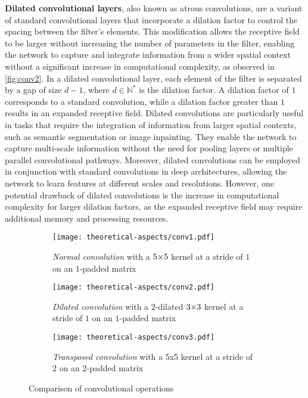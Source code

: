 \textbf{Dilated convolutional layers}, also known as atrous convolutions, are a variant of standard convolutional layers that incorporate a dilation factor to control the spacing between the filter's elements. This modification allows the receptive field to be larger without increasing the number of parameters in the filter, enabling the network to capture and integrate information from a wider spatial context without a significant increase in computational complexity, as observed in \autoref{fig:conv2}. In a dilated convolutional layer, each element of the filter is separated by a gap of size $d-1$, where $d \in \mathbb{N}^{\ast}$ is the dilation factor. A dilation factor of $1$ corresponds to a standard convolution, while a dilation factor greater than $1$ results in an expanded receptive field. Dilated convolutions are particularly useful in tasks that require the integration of information from larger spatial contexts, such as semantic segmentation or image inpainting. They enable the network to capture multi-scale information without the need for pooling layers or multiple parallel convolutional pathways. Moreover, dilated convolutions can be employed in conjunction with standard convolutions in deep architectures, allowing the network to learn features at different scales and resolutions. However, one potential drawback of dilated convolutions is the increase in computational complexity for larger dilation factors, as the expanded receptive field may require additional memory and processing resources.
\begin{figure}[ht]
    \centering
    \captionsetup[subfigure]{justification=centering}
    \begin{subfigure}[b]{0.32\textwidth}
        \centering
        \texttt{[image: theoretical-aspects/conv1.pdf]}
        \caption{\emph{Normal convolution} with a $5 {\times} 5$ kernel at a stride of $1$ on an $1$-padded matrix}
        \label{fig:conv1}
    \end{subfigure}
    \hspace*{\fill}
    \begin{subfigure}[b]{0.32\textwidth}
        \centering
        \texttt{[image: theoretical-aspects/conv2.pdf]}
        \caption{\emph{Dilated convolution} with a $2$-dilated $3 {\times} 3$ kernel at a stride of $1$ on an $1$-padded matrix}
        \label{fig:conv2}
    \end{subfigure}
    \hspace*{\fill}
    \begin{subfigure}[b]{0.32\textwidth}
        \centering
        \texttt{[image: theoretical-aspects/conv3.pdf]}
        \caption{\emph{Transposed convolution} with a 5x5 kernel at a stride of 2 on an 2-padded matrix}
        \label{fig:conv3}
    \end{subfigure}

    \caption[Comparison of convolutional operations]{Comparison of convolutional operations~\supercite{conv-guide}}
    \label{fig:convolutions}
\end{figure}

